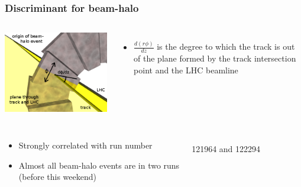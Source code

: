 \documentclass[compress]{beamer}
\begin{document}
\begin{frame}
\frametitle{Discriminant for beam-halo}

\begin{columns}
\includegraphics[width=\linewidth]{track_lhc_plane_closeup.png}

\begin{itemize}
\item $\frac{d(r\phi)}{dz}$ is the degree to which the track is out of the plane formed by the track intersection point and the LHC beamline
\end{itemize}
\end{columns}

\vspace{-0.5 cm}
\begin{columns}
\vspace{0.5 cm}
\begin{itemize}
\item Strongly correlated with run number
\item Almost all beam-halo events are in two runs \\ (before this weekend)
\end{itemize}

\begin{center}
\mbox{ } \\ 121964 and 122294
\end{center}


\end{columns}
\end{frame}
\end{document}

